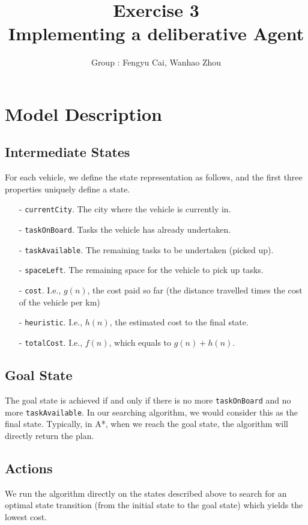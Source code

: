 \documentclass[10.5pt]{article}
\title{\bf Exercise 3\\ Implementing a deliberative Agent}
\author{Group \textnumero 9: Fengyu Cai, Wanhao Zhou}
\begin{document}
\maketitle

\section{Model Description}

\subsection{Intermediate States}
For each vehicle, we define the state representation as follows, and the first three properties uniquely define a state.
\begin{enumerate}
	\item[-] \texttt{currentCity}. The city where the vehicle is currently in.
	\item[-] \texttt{taskOnBoard}. Tasks the vehicle has already undertaken.
	\item[-]	 \texttt{taskAvailable}. The remaining tasks to be undertaken (picked up).
	\item[-] \texttt{spaceLeft}. The remaining space for the vehicle to pick up tasks.
	\item[-]	 \texttt{cost}. I.e., $g(n)$, the cost paid so far (the distance travelled times the cost of the vehicle per km)
	\item[-] \texttt{heuristic}. I.e., $h(n)$, the estimated cost to the final state.
	\item[-] \texttt{totalCost}. I.e., $f(n)$, which equals to $g(n) + h(n)$.
\end{enumerate}

\subsection{Goal State}
The goal state is achieved if and only if there is no more \texttt{taskOnBoard} and no more \texttt{taskAvailable}. In our searching algorithm, we would consider this as the final state. Typically, in A*, when we reach the goal state, the algorithm will directly return the plan.

\subsection{Actions}
We run the algorithm directly on the states described above to search for an optimal state transition (from the initial state to the goal state) which yields the lowest cost. 
\end{document}
